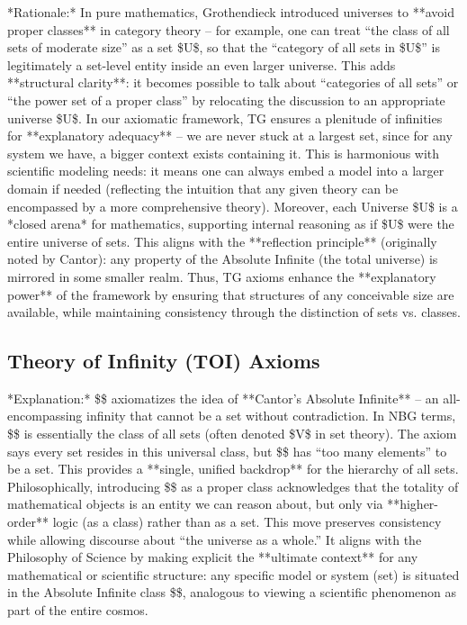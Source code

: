 \documentclass[11pt]{article}
\begin{document}
    *Rationale:* In pure mathematics, Grothendieck introduced universes to **avoid proper classes** in category theory – for example, one can treat “the class of all sets of moderate size” as a set \$U\$, so that the “category of all sets in \$U\$” is legitimately a set-level entity inside an even larger universe. This adds **structural clarity**: it becomes possible to talk about “categories of all sets” or “the power set of a proper class” by relocating the discussion to an appropriate universe \$U\$. In our axiomatic framework, TG ensures a plenitude of infinities for **explanatory adequacy** – we are never stuck at a largest set, since for any system we have, a bigger context exists containing it. This is harmonious with scientific modeling needs: it means one can always embed a model into a larger domain if needed (reflecting the intuition that any given theory can be encompassed by a more comprehensive theory). Moreover, each Universe \$U\$ is a *closed arena* for mathematics, supporting internal reasoning as if \$U\$ were the entire universe of sets. This aligns with the **reflection principle** (originally noted by Cantor): any property of the Absolute Infinite (the total universe) is mirrored in some smaller realm. Thus, TG axioms enhance the **explanatory power** of the framework by ensuring that structures of any conceivable size are available, while maintaining consistency through the distinction of sets vs. classes.

\subsection*{Theory of Infinity (TOI) Axioms}

\begin{enumerate}
  \item **Absolute Infinite Class (\$\infty\$):** \$\infty\$ is a distinguished proper class that contains every set: \$\forall x,\[\mathsf{Set}(x) \rightarrow x \in \infty]\$. Moreover, \$\neg\mathsf{Set}(\infty)\$ (so \$\infty\$ is not itself a set).
\end{enumerate}
    *Explanation:* \$\infty\$ axiomatizes the idea of **Cantor’s Absolute Infinite** – an all-encompassing infinity that cannot be a set without contradiction. In NBG terms, \$\infty\$ is essentially the class of all sets (often denoted \$V\$ in set theory). The axiom says every set resides in this universal class, but \$\infty\$ has “too many elements” to be a set. This provides a **single, unified backdrop** for the hierarchy of all sets. Philosophically, introducing \$\infty\$ as a proper class acknowledges that the totality of mathematical objects is an entity we can reason about, but only via **higher-order** logic (as a class) rather than as a set. This move preserves consistency while allowing discourse about “the universe as a whole.” It aligns with the Philosophy of Science by making explicit the **ultimate context** for any mathematical or scientific structure: any specific model or system (set) is situated in the Absolute Infinite class \$\infty\$, analogous to viewing a scientific phenomenon as part of the entire cosmos.
\end{document}
